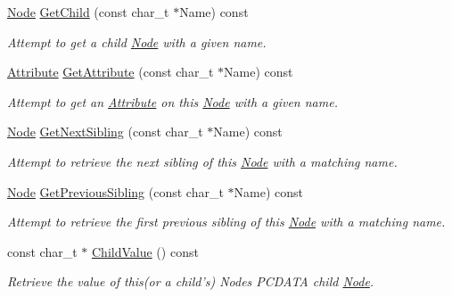 \begin{DoxyCompactItemize}
\hyperlink{classphys_1_1xml_1_1Node}{Node} \hyperlink{classphys_1_1xml_1_1Node_a4d3f74c2c2613c84376b1ab6f3ed19c9}{GetChild} (const char\_\-t $\ast$Name) const 
\begin{DoxyCompactList}\small\item\em Attempt to get a child \hyperlink{classphys_1_1xml_1_1Node}{Node} with a given name. \item\end{DoxyCompactList}\item 
\hyperlink{classphys_1_1xml_1_1Attribute}{Attribute} \hyperlink{classphys_1_1xml_1_1Node_a338eeb27d2a0cf39823f228abb5d936c}{GetAttribute} (const char\_\-t $\ast$Name) const 
\begin{DoxyCompactList}\small\item\em Attempt to get an \hyperlink{classphys_1_1xml_1_1Attribute}{Attribute} on this \hyperlink{classphys_1_1xml_1_1Node}{Node} with a given name. \item\end{DoxyCompactList}\item 
\hyperlink{classphys_1_1xml_1_1Node}{Node} \hyperlink{classphys_1_1xml_1_1Node_abd5e18e840cbfc2f8336c20782bec488}{GetNextSibling} (const char\_\-t $\ast$Name) const 
\begin{DoxyCompactList}\small\item\em Attempt to retrieve the next sibling of this \hyperlink{classphys_1_1xml_1_1Node}{Node} with a matching name. \item\end{DoxyCompactList}\item 
\hyperlink{classphys_1_1xml_1_1Node}{Node} \hyperlink{classphys_1_1xml_1_1Node_adaf337574156c86bbdb76264c5451c8d}{GetPreviousSibling} (const char\_\-t $\ast$Name) const 
\begin{DoxyCompactList}\small\item\em Attempt to retrieve the first previous sibling of this \hyperlink{classphys_1_1xml_1_1Node}{Node} with a matching name. \item\end{DoxyCompactList}\item 
const char\_\-t $\ast$ \hyperlink{classphys_1_1xml_1_1Node_a97363b63a1963e28bf7503c32b0702e5}{ChildValue} () const 
\begin{DoxyCompactList}\small\item\em Retrieve the value of this(or a child's) Nodes PCDATA child \hyperlink{classphys_1_1xml_1_1Node}{Node}. \item\end{DoxyCompactList}\item 

\end{DoxyCompactItemize}
